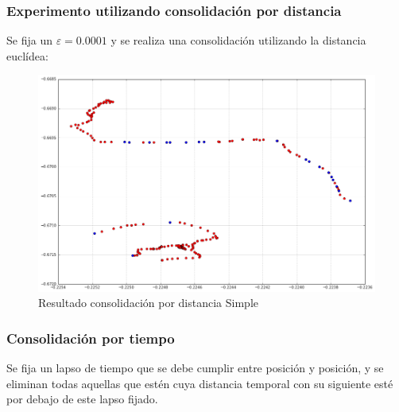 \documentclass[10pt, spanish]{beamer}
\begin{document}
\begin{frame}[fragile]
\frametitle{Experimento utilizando consolidaci\'on por distancia}
Se fija un $\varepsilon = 0.0001$ y se realiza una consolidaci\'on utilizando la distancia eucl\'idea:\\

\bigskip

\begin{figure}[H]
	\includegraphics[scale=.25]{distanceEuEps10-4.png}
	\caption{Resultado consolidaci\'on por distancia Simple}
\end{figure}

\end{frame}

\begin{frame}[fragile]
\frametitle{Consolidaci\'on por tiempo}

Se fija un lapso de tiempo que se debe cumplir entre posici\'on y posici\'on, y se eliminan todas aquellas que est\'en cuya distancia temporal con su siguiente est\'e por debajo de este lapso fijado.\\

\bigskip
\begin{algorithmic}[1]
		\EndIf
	\EndFor
\EndFunction
\end{algorithmic}
\end{frame}
\end{document}

